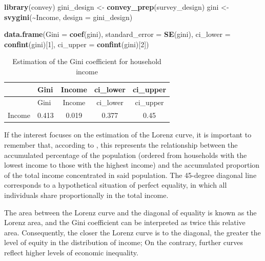 \documentclass[
  english,
  12pt,
]{book}
\newenvironment{Shaded}{\begin{snugshade}}{\end{snugshade}}
\newcommand{\AttributeTok}[1]{\textcolor[rgb]{0.13,0.29,0.53}{#1}}
\newcommand{\DecValTok}[1]{\textcolor[rgb]{0.00,0.00,0.81}{#1}}
\newcommand{\FunctionTok}[1]{\textcolor[rgb]{0.13,0.29,0.53}{\textbf{#1}}}
\newcommand{\NormalTok}[1]{#1}
\newcommand{\OtherTok}[1]{\textcolor[rgb]{0.56,0.35,0.01}{#1}}
\newcommand{\SpecialCharTok}[1]{\textcolor[rgb]{0.81,0.36,0.00}{\textbf{#1}}}
\begin{document}
\begin{Shaded}
\begin{Highlighting}[]
\FunctionTok{library}\NormalTok{(convey)}
\NormalTok{gini\_design }\OtherTok{\textless{}{-}} \FunctionTok{convey\_prep}\NormalTok{(survey\_design)}
\NormalTok{gini }\OtherTok{\textless{}{-}} \FunctionTok{svygini}\NormalTok{(}\SpecialCharTok{\textasciitilde{}}\NormalTok{Income, }\AttributeTok{design =}\NormalTok{ gini\_design)}

\FunctionTok{data.frame}\NormalTok{(}\AttributeTok{Gini =} \FunctionTok{coef}\NormalTok{(gini),}
           \AttributeTok{standard\_error =} \FunctionTok{SE}\NormalTok{(gini),}
           \AttributeTok{ci\_lower =} \FunctionTok{confint}\NormalTok{(gini)[}\DecValTok{1}\NormalTok{],}
           \AttributeTok{ci\_upper =} \FunctionTok{confint}\NormalTok{(gini)[}\DecValTok{2}\NormalTok{])}
\end{Highlighting}
\end{Shaded}

\begin{longtable}[]{@{}llccc@{}}
\caption{\label{tab:tab-gini}Estimation of the Gini coefficient for household income}\tabularnewline
\toprule\noalign{}
& Gini & Income & ci\_lower & ci\_upper \\
\midrule\noalign{}
\endfirsthead
\toprule\noalign{}
& Gini & Income & ci\_lower & ci\_upper \\
\midrule\noalign{}
\endhead
\bottomrule\noalign{}
\endlastfoot
Income & 0.413 & 0.019 & 0.377 & 0.45 \\
\end{longtable}

If the interest focuses on the estimation of the Lorenz curve, it is important to remember that, according to \citet{kovacevic1997}, this represents the relationship between the accumulated percentage of the population (ordered from households with the lowest income to those with the highest income) and the accumulated proportion of the total income concentrated in said population. The 45-degree diagonal line corresponds to a hypothetical situation of perfect equality, in which all individuals share proportionally in the total income.

The area between the Lorenz curve and the diagonal of equality is known as the Lorenz area, and the Gini coefficient can be interpreted as twice this relative area. Consequently, the closer the Lorenz curve is to the diagonal, the greater the level of equity in the distribution of income; On the contrary, further curves reflect higher levels of economic inequality.
\end{document}
